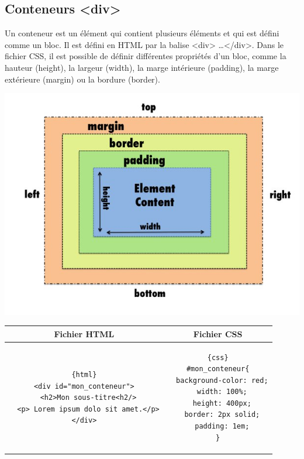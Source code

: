 \documentclass[a4paper,11pt]{article}
\begin{document}
\subsection{Conteneurs <div>}
\begin{multicols}{2}
\begin{minipage}{1\textwidth}
Un conteneur est un élément qui contient plusieurs éléments et qui est défini comme un bloc.
Il est défini en HTML par la balise <div> \dots </div>. Dans le fichier CSS, il est possible de définir différentes propriétés d'un bloc, comme la hauteur (height), la largeur (width), la marge intérieure (padding), la marge extérieure (margin) ou la bordure (border).
\end{minipage}
\includegraphics[width= 1\textwidth]{images/conteneur.png}
\end{multicols}

\begin{tabular}{|c|c|}
\hline
\centering Fichier HTML & Fichier CSS\tabularnewline
\hline
\begin{minipage}{1\textwidth}
\begin{verbatim}{html}
<div id="mon_conteneur">
  <h2>Mon sous-titre<h2/>
  <p> Lorem ipsum dolo sit amet.</p>
</div>
\end{verbatim}
\end{minipage}&
\begin{minipage}{1\textwidth}
\begin{verbatim}{css}
#mon_conteneur{
  background-color: red;
  width: 100%;
  height: 400px;
  border: 2px solid;
  padding: 1em;
}
\end{verbatim}
\end{minipage}\tabularnewline
\hline
\end{tabular}\par
\end{document}
